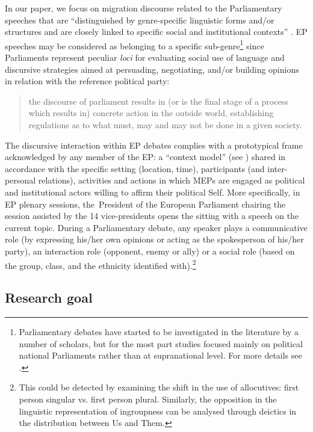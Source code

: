 \documentclass[output=paper]{langscibook}
\begin{document}
\begin{sloppypar}
In our paper, we focus on migration discourse related to the Parliamentary speeches that are “distinguished by genre-specific linguistic forms and/or structures and are closely linked to specific social and institutional contexts” \citep[32]{Fairclough2006}. EP speeches may be considered as belonging to a specific sub-genre\footnote{Parliamentary debates have started to be investigated in the literature by a number of scholars, but for the most part studies focused mainly on political national Parliaments rather than at supranational level. For more details see \citet[5--6]{Ilie2015}.} since Parliaments represent peculiar \textit{loci} for evaluating social use of language and discursive strategies aimed at persuading, negotiating, and/or building opinions in relation with the reference political party:
\end{sloppypar}

\begin{quote}
the discourse of parliament results in (or is the final stage of a process which results in) concrete action in the outside world, establishing regulations as to what must, may and may not be done in a given society. \citep[12]{Bayley2004}
\end{quote}

The discursive interaction within EP debates complies with a prototypical frame acknowledged by any member of the EP: a “context model” (see \citealt{VanDijk2003}) shared in accordance with the specific setting (location, time), participants (and inter-personal relations), activities and actions in which MEPs are engaged as political and institutional actors willing to affirm their political Self. More specifically, in EP plenary sessions, the~President of the European Parliament chairing the session assisted by the 14 vice-presidents opens the sitting with a speech on the current topic. During a Parliamentary debate, any speaker plays a communicative role (by expressing his/her own opinions or acting as the spokesperson of his/her party), an interaction role (opponent, enemy or ally) or a social role (based on the group, class, and the ethnicity identified with).\footnote{This could be detected by examining the shift in the use of allocutives: first person singular vs. first person plural. Similarly, the opposition in the linguistic representation of ingroupness can be analysed through deictics in the distribution between Us and Them.}


\subsection{Research goal}\label{sec:mori:3.1}
\end{document}
